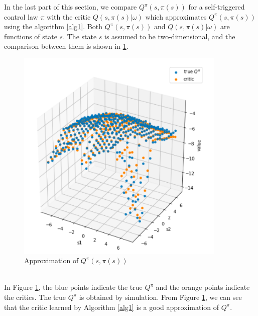 \documentclass[english, dvipdfmx]{ampmt}             %
\begin{document}
In the last part of this section, we compare $Q^{\pi}(s, \pi(s))$ for a self-triggered control law $\pi$ with the critic $Q(s,\pi(s)|\omega)$ which approximates $Q^{\pi}(s, \pi(s))$ using the algorithm \ref{alg1}. Both $Q^{\pi}(s, \pi(s))$ and $Q(s, \pi(s)|\omega)$ are functions of state $s$. The state $s$ is assumed to be two-dimensional, and the comparison between them is shown in \ref{Q_approximation}. 
\begin{figure}[h]
	\centering
 	\includegraphics[width=10cm]{Q_approximation.png}
 	\caption{Approximation of $Q^{\pi}(s,\pi(s))$} \label{Q_approximation}
\end{figure}\\
In Figure \ref{Q_approximation}, the blue points indicate the true $Q^{\pi}$ and the orange points indicate the critics. The true $Q^{\pi}$ is obtained by simulation. From Figure \ref{Q_approximation}, we can see that the critic learned by Algorithm \ref{alg1} is a good approximation of $Q^{\pi}$.
\end{document}
